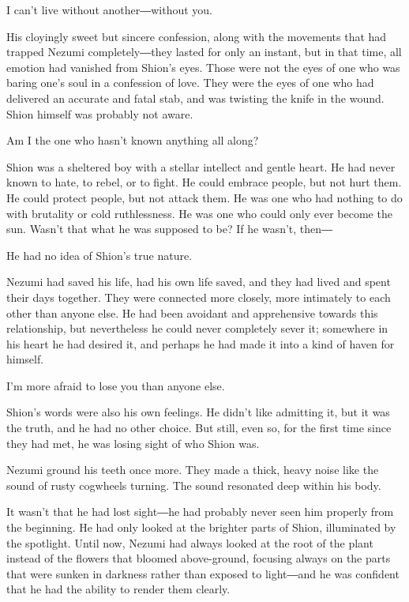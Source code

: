 I can't live without another―without you.

His cloyingly sweet but sincere confession, along with the movements
that had trapped Nezumi completely―they lasted for only an instant, but
in that time, all emotion had vanished from Shion's eyes. Those were not
the eyes of one who was baring one's soul in a confession of love. They
were the eyes of one who had delivered an accurate and fatal stab, and
was twisting the knife in the wound. Shion himself was probably not
aware.

Am I the one who hasn't known anything all along?

Shion was a sheltered boy with a stellar intellect and gentle heart. He
had never known to hate, to rebel, or to fight. He could embrace people,
but not hurt them. He could protect people, but not attack them. He was
one who had nothing to do with brutality or cold ruthlessness. He was
one who could only ever become the sun. Wasn't that what he was supposed
to be? If he wasn't, then―

He had no idea of Shion's true nature.

Nezumi had saved his life, had his own life saved, and they had lived
and spent their days together. They were connected more closely, more
intimately to each other than anyone else. He had been avoidant and
apprehensive towards this relationship, but nevertheless he could never
completely sever it; somewhere in his heart he had desired it, and
perhaps he had made it into a kind of haven for himself.

I'm more afraid to lose you than anyone else.

Shion's words were also his own feelings. He didn't like admitting it,
but it was the truth, and he had no other choice. But still, even so,
for the first time since they had met, he was losing sight of who Shion
was.

Nezumi ground his teeth once more. They made a thick, heavy noise like
the sound of rusty cogwheels turning. The sound resonated deep within
his body.

It wasn't that he had lost sight―he had probably never seen him properly
from the beginning. He had only looked at the brighter parts of Shion,
illuminated by the spotlight. Until now, Nezumi had always looked at the
root of the plant instead of the flowers that bloomed above-ground,
focusing always on the parts that were sunken in darkness rather than
exposed to light―and he was confident that he had the ability to render
them clearly.

